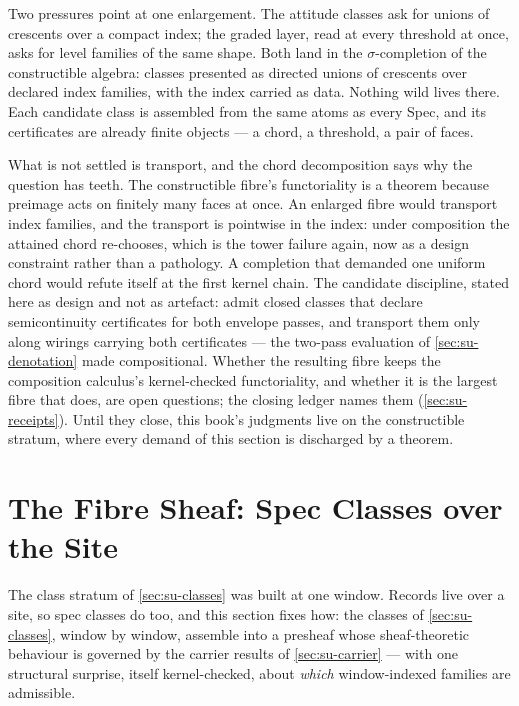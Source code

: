 Two pressures point at one enlargement. The attitude classes ask
for unions of crescents over a compact index; the graded layer,
read at every threshold at once, asks for level families of the
same shape. Both land in the $\sigma$-completion of the
constructible algebra: classes presented as directed unions of
crescents over declared index families, with the index carried as
data. Nothing wild lives there. Each candidate class is assembled
from the same atoms as every Spec, and its certificates are
already finite objects --- a chord, a threshold, a pair of faces.

What is not settled is transport, and the chord decomposition says
why the question has teeth. The constructible fibre's
functoriality is a theorem because preimage acts on finitely many
faces at once. An enlarged fibre would transport index families,
and the transport is pointwise in the index: under composition the
attained chord re-chooses, which is the tower failure again, now
as a design constraint rather than a pathology. A completion that
demanded one uniform chord would refute itself at the first kernel
chain. The candidate discipline, stated here as design and not as
artefact: admit closed classes that declare semicontinuity
certificates for both envelope passes, and transport them only
along wirings carrying both certificates --- the two-pass
evaluation of \autoref{sec:su-denotation} made compositional.
Whether the resulting fibre keeps the composition calculus's
kernel-checked functoriality, and whether it is the largest fibre
that does, are open questions; the closing ledger names them
(\autoref{sec:su-receipts}). Until they close, this book's
judgments live on the constructible stratum, where every demand of
this section is discharged by a theorem.

\section{The Fibre Sheaf: Spec Classes over the Site}
\label{sec:su-sheaf}

The class stratum of \autoref{sec:su-classes} was built at one
window. Records live over a site, so spec classes do too, and this
section fixes how: the classes of \autoref{sec:su-classes},
window by window, assemble into a presheaf whose sheaf-theoretic
behaviour is governed by the carrier results of
\autoref{sec:su-carrier} --- with one structural surprise, itself
kernel-checked, about \emph{which} window-indexed families are
admissible.

